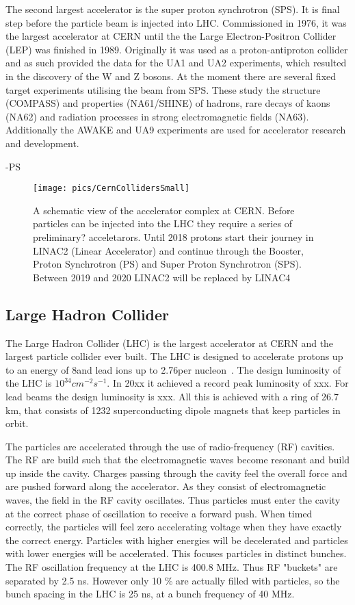 The second largest accelerator is the super proton synchrotron (SPS). It is final step before the particle beam is injected into LHC. Commissioned in 1976, it was the largest accelerator at CERN until the the Large Electron-Positron Collider (LEP) was finished in 1989. Originally it was used as a proton-antiproton collider and as such provided the data for the UA1 and UA2 experiments, which resulted in the discovery of the W and Z bosons. At the moment there are several fixed target experiments utilising the beam from SPS. These study the structure (COMPASS) and properties (NA61/SHINE) of hadrons, rare decays of kaons (NA62) and radiation processes in strong electromagnetic fields (NA63). Additionally the AWAKE and UA9 experiments are used for accelerator research and development. 

-PS

\begin{figure}
\centering
\texttt{[image: pics/CernCollidersSmall]}
\caption[CERN collider complex]{ A schematic view of the accelerator complex at CERN. Before particles can be injected into the LHC they require a series of preliminary? acceletarors. Until 2018 protons start their journey in LINAC2 (Linear Accelerator) and continue through the Booster, Proton Synchrotron (PS) and Super Proton Synchrotron (SPS). Between 2019 and 2020 LINAC2 will be replaced by LINAC4~\cite{CernComplex}}

\label{fig:CernComplex}
\end{figure}
\subsection{Large Hadron Collider}
\label{sec:lhc}
The Large Hadron Collider (LHC) is the largest accelerator at CERN and the largest particle collider ever built. The LHC is designed to accelerate protons up to an energy of 8\tev and lead ions up to 2.76\tev per nucleon~\cite{LHC}. The design luminosity of the LHC is $10^34 \unit{cm^{-2}s^{-1}}$. In 20xx it achieved a record peak luminosity of xxx. For lead beams the design luminosity is xxx. All this is achieved with a ring of 26.7 km, that consists of 1232 superconducting dipole magnets that keep particles in orbit. 

The particles are accelerated through the use of radio-frequency (RF) cavities. The RF are build such that the electromagnetic waves become resonant and build up inside the cavity. Charges passing through the cavity feel the overall force and are pushed forward along the accelerator. As they consist of electromagnetic waves, the field in the RF cavity oscillates. Thus particles must enter the cavity at the correct phase of oscillation to receive a forward push. When timed correctly, the particles will feel zero accelerating voltage when they have exactly the correct energy. Particles with higher energies will be decelerated  and particles with lower energies will be accelerated. This focuses particles in distinct bunches. The RF oscillation frequency at the LHC is 400.8 MHz. Thus  RF "buckets" are separated by 2.5 ns. However only 10 \% are actually filled with particles, so the bunch spacing in the LHC is 25 ns, at a bunch frequency of 40 MHz.

